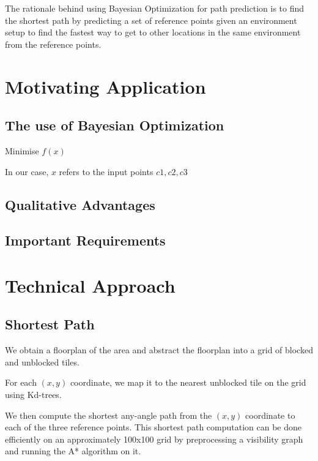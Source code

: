 \documentclass[letterpaper]{article}
\begin{document}
The rationale behind using Bayesian Optimization for path prediction is to find the shortest path by predicting a set of reference points given an environment setup to find the fastest way to get to other locations in the same environment from the reference points.

\section{Motivating Application}



\subsection{The use of Bayesian Optimization}

Minimise $f(x)$

In our case, $x$ refers to the input points $c1, c2, c3$

\subsection{Qualitative Advantages}



\subsection{Important Requirements}



\section{Technical Approach}



\subsection{Shortest Path}

We obtain a floorplan of the area and abstract the floorplan into a grid of blocked and unblocked tiles.

For each $(x,y)$ coordinate, we map it to the nearest unblocked tile on the grid using Kd-trees.

We then compute the shortest any-angle path from the $(x,y)$ coordinate to each of the three reference points. This shortest path computation can be done efficiently on an approximately 100x100 grid by preprocessing a visibility graph and running the A* algorithm on it.
\end{document}
